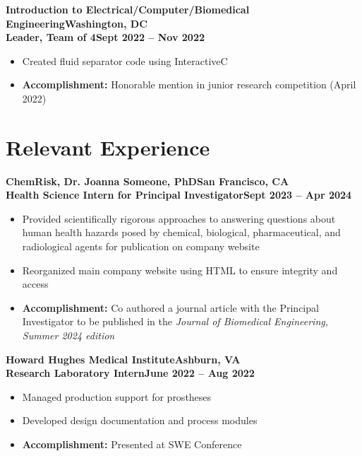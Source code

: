 \documentclass[10pt]{article}
\begin{document}
\vspace{5pt}
\textbf{Introduction to Electrical/Computer/Biomedical Engineering}\hfill \textbf{Washington, DC}\\
\textbf{Leader, Team of 4}\hfill \textbf{Sept 2022 -- Nov 2022}
\begin{itemize}
    \item Created fluid separator code using InteractiveC
    \item \textbf{Accomplishment:} Honorable mention in junior research competition (April 2022)
\end{itemize}

\section*{Relevant Experience}
\textbf{ChemRisk, Dr. Joanna Someone, PhD}\hfill \textbf{San Francisco, CA}\\
\textbf{Health Science Intern for Principal Investigator}\hfill \textbf{Sept 2023 -- Apr 2024}
\begin{itemize}
    \item Provided scientifically rigorous approaches to answering questions about human health hazards posed by
    chemical, biological, pharmaceutical, and radiological agents for publication on company website
    \item Reorganized main company website using HTML to ensure integrity and access
    \item \textbf{Accomplishment:} Co­ authored a journal article with the Principal Investigator to be published in the \textit{Journal of Biomedical Engineering, Summer 2024 edition}
\end{itemize}

\vspace{5pt}
\textbf{Howard Hughes Medical Institute}\hfill \textbf{Ashburn, VA}\\
\textbf{Research Laboratory Intern}\hfill \textbf{June 2022 -- Aug 2022}
\begin{itemize}
    \item Managed production support for prostheses
    \item Developed design documentation and process modules
    \item \textbf{Accomplishment:} Presented at SWE Conference
\end{itemize}
\end{document}
